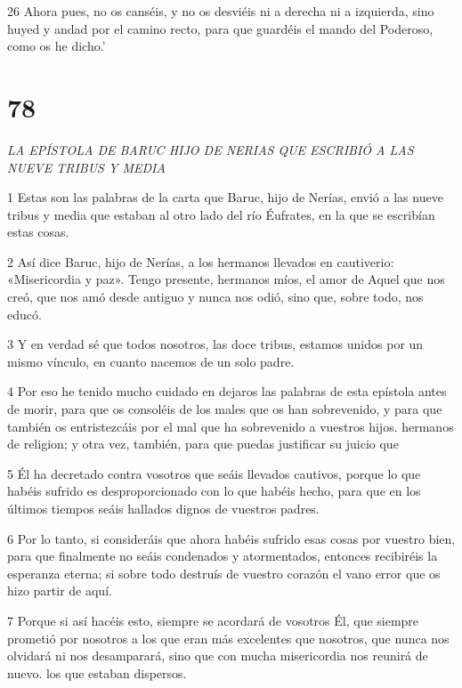 \par 26 Ahora pues, no os canséis, y no os desviéis ni a derecha ni a izquierda, sino huyed y andad por el camino recto, para que guardéis el mando del Poderoso, como os he dicho.'

\chapter{78}

\par \textit{LA EPÍSTOLA DE BARUC HIJO DE NERIAS QUE ESCRIBIÓ A LAS NUEVE TRIBUS Y MEDIA}

\par 1 Estas son las palabras de la carta que Baruc, hijo de Nerías, envió a las nueve tribus y media que estaban al otro lado del río Éufrates, en la que se escribían estas cosas.

\par 2 Así dice Baruc, hijo de Nerías, a los hermanos llevados en cautiverio: «Misericordia y paz». Tengo presente, hermanos míos, el amor de Aquel que nos creó, que nos amó desde antiguo y nunca nos odió, sino que, sobre todo, nos educó.

\par 3 Y en verdad sé que todos nosotros, las doce tribus, estamos unidos por un mismo vínculo, en cuanto nacemos de un solo padre.

\par 4 Por eso he tenido mucho cuidado en dejaros las palabras de esta epístola antes de morir, para que os consoléis de los males que os han sobrevenido, y para que también os entristezcáis por el mal que ha sobrevenido a vuestros hijos. hermanos de religion; y otra vez, también, para que puedas justificar su juicio que

\par 5 Él ha decretado contra vosotros que seáis llevados cautivos, porque lo que habéis sufrido es desproporcionado con lo que habéis hecho, para que en los últimos tiempos seáis hallados dignos de vuestros padres.

\par 6 Por lo tanto, si consideráis que ahora habéis sufrido esas cosas por vuestro bien, para que finalmente no seáis condenados y atormentados, entonces recibiréis la esperanza eterna; si sobre todo destruís de vuestro corazón el vano error que os hizo partir de aquí.

\par 7 Porque si así hacéis esto, siempre se acordará de vosotros Él, que siempre prometió por nosotros a los que eran más excelentes que nosotros, que nunca nos olvidará ni nos desamparará, sino que con mucha misericordia nos reunirá de nuevo. los que estaban dispersos.

